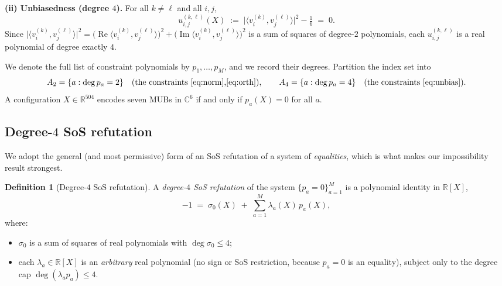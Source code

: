 \documentclass{amsart}
\theoremstyle{definition}
\newtheorem{definition}{Definition}
\theoremstyle{remark}
\begin{document}
\medskip
\noindent\textbf{(ii) Unbiasedness (degree $4$).} For all $k\ne\ell$ and all $i,j$,
\begin{equation}\label{eq:unbias}
u^{(k,\ell)}_{i,j}(X)\;:=\;\bigl|\langle v^{(k)}_i,v^{(\ell)}_j\rangle\bigr|^2-\tfrac16\;=\;0 .
\end{equation}
Since $\bigl|\langle v^{(k)}_i,v^{(\ell)}_j\rangle\bigr|^2
=\bigl(\operatorname{Re}\langle v^{(k)}_i,v^{(\ell)}_j\rangle\bigr)^2
+\bigl(\operatorname{Im}\langle v^{(k)}_i,v^{(\ell)}_j\rangle\bigr)^2$ is a sum of squares of
degree-$2$ polynomials, each $u^{(k,\ell)}_{i,j}$ is a real polynomial of degree exactly $4$.

We denote the full list of constraint polynomials by $p_1,\dots,p_M$, and we record their
degrees. Partition the index set into
\[
A_2=\{a:\deg p_a=2\}\quad(\text{the constraints \eqref{eq:norm},\eqref{eq:orth}}),
\qquad
A_4=\{a:\deg p_a=4\}\quad(\text{the constraints \eqref{eq:unbias}}).
\]
A configuration $X\in\mathbb{R}^{504}$ encodes seven MUBs in $\mathbb{C}^6$ if and only if
$p_a(X)=0$ for all $a$.

\subsection{Degree-$4$ SoS refutation}
We adopt the general (and most permissive) form of an SoS refutation of a system of
\emph{equalities}, which is what makes our impossibility result strongest.

\begin{definition}[Degree-$4$ SoS refutation]\label{def:refutation}
A \emph{degree-$4$ SoS refutation} of the system $\{p_a=0\}_{a=1}^M$ is a polynomial identity
in $\mathbb{R}[X]$,
\begin{equation}\label{eq:refutation}
-1\;=\;\sigma_0(X)\;+\;\sum_{a=1}^{M}\lambda_a(X)\,p_a(X),
\end{equation}
where:
\begin{itemize}
\item $\sigma_0$ is a sum of squares of real polynomials with $\deg\sigma_0\le 4$;
\item each $\lambda_a\in\mathbb{R}[X]$ is an \emph{arbitrary} real polynomial (no sign or SoS
restriction, because $p_a=0$ is an equality), subject only to the degree cap
$\deg(\lambda_a p_a)\le 4$.
\end{itemize}
\end{definition}
\end{document}
